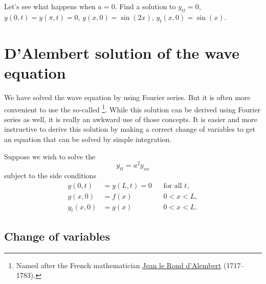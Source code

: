 \begin{exercise}
Let's see what happens when $a=0$.  Find a solution to
$y_{tt} = 0$, $y(0,t) = y(\pi,t) = 0$,
$y(x,0) = \sin(2x)$,
$y_t(x,0) = \sin(x)$.
\end{exercise}


\sectionnewpage
\section{D'Alembert solution of the wave equation}
\label{dalemb:section}


We have solved the wave equation by using Fourier series.  But it is often
more convenient to use the so-called
\emph{}%
\footnote{Named after the French mathematician
\href{https://en.wikipedia.org/wiki/D\%27Alembert}{Jean le Rond d'Alembert}
(1717--1783).}.
While this solution can be derived using Fourier series as well, it
is really an awkward use of those concepts.  It is easier and more
instructive to derive this
solution by making a correct change of variables to get an equation that
can be solved by simple integration.

Suppose we wish to solve the 
\begin{equation} \label{dalemb:weq}
y_{tt} = a^2 y_{xx}
\end{equation}
subject to the side conditions
\begin{equation} \label{dalemb:weqside}
\begin{aligned}
y(0,t) &=  y(L,t) = 0 &
& \text{for all } t , \\
y(x,0) &= f(x) &  & 0 < x < L , \\
y_t(x,0) &= g(x) &  & 0 < x < L .
\end{aligned}
\end{equation}

\subsection{Change of variables}

